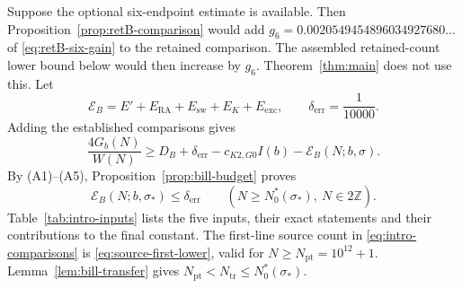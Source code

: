 Suppose the optional six-endpoint estimate is available.
Then Proposition~\ref{prop:retB-comparison} would add\hfill\break
$g_6=0.0020549454896034927680\ldots$ of \eqref{eq:retB-six-gain} to the
retained comparison. The assembled retained-count lower bound below would
then increase by $g_6$.
Theorem~\ref{thm:main} does not use this.
Let
\begin{equation}\label{eq:intro-total-error}
 \mathcal E_B=E'+E_{\mathrm{RA}}+E_{\mathrm{sw}}+E_K+E_{\mathrm{exc}},
 \qquad \delta_{\mathrm{err}}=\frac1{10000}.
\end{equation}
Adding the established comparisons gives
\begin{equation}\label{eq:intro-assembled}
 \frac{4G_b(N)}{W(N)}\ge
 D_B+\delta_{\mathrm{err}}-c_{K2,G0}I(b)-\mathcal E_B(N;b,\sigma).
\end{equation}
By \textup{(A1)}--\textup{(A5)}, Proposition~\ref{prop:bill-budget}
proves
\begin{equation}\label{eq:intro-error-bound}
 \mathcal E_B(N;b,\sigma_*)\le\delta_{\mathrm{err}}
 \qquad(N\ge N_0^*(\sigma_*),\ N\in2\mathbb Z).
\end{equation}
Table~\ref{tab:intro-inputs} lists the five inputs, their exact
statements and their contributions to the final constant.
The first-line source count in \eqref{eq:intro-comparisons} is
\eqref{eq:source-first-lower}, valid for
$N\ge N_{\mathrm{pt}}=10^{12}+1$. Lemma~\ref{lem:bill-transfer} gives
$N_{\mathrm{pt}}<N_{\mathrm{tr}}\le N_0^*(\sigma_*)$.
\begingroup
\small
\renewcommand{\arraystretch}{1.08}

